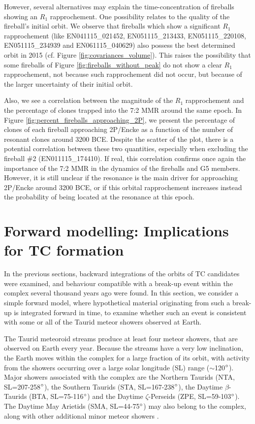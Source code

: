 \documentclass[letters,a4paper,fleqn,usenatbib]{mnras}
\begin{document}
However, several alternatives may explain the time-concentration of fireballs showing an $R_1$ rapprochement. One possibility relates to the quality of the fireball's initial orbit. We observe that fireballs which show a  significant $R_1$ rapprochement (like EN041115\_021452, EN051115\_213433, EN051115\_220108, EN051115\_234939 and EN061115\_040629) also possess the best determined orbit in 2015 (cf. Figure \ref{fig:covariances_volume}). This raises the possibility that some fireballs of Figure \ref{fig:fireballs_without_peak} do not show a clear $R_1$ rapprochement, not because such rapprochement did not occur, but because of the larger uncertainty of their initial orbit.
 
 Also, we see a correlation between the magnitude of the $R_1$ rapprochement and the percentage of clones trapped into the 7:2 MMR around the same epoch. In Figure \ref{fig:percent_fireballs_approaching_2P}, we present the percentage of clones of each fireball approaching 2P/Encke as a function of the number of resonant clones around 3200 BCE. Despite the scatter of the plot, there is a potential correlation between these two quantities, especially when excluding the fireball \#2 (EN011115\_174410). If real, this correlation confirms once again the importance of the 7:2 MMR in the dynamics of the fireballs and G5 members. However, it is still unclear if the resonance is the main driver for approaching 2P/Encke around 3200 BCE, or if this orbital rapprochement increases instead the probability of being located at the resonance at this epoch.  


 \section{Forward modelling: Implications for TC formation} \label{sec:TC_formation}

In the previous sections, backward integrations of the orbits of TC candidates were examined, and behaviour compatible with a break-up event within the complex several thousand years ago were found. In this section, we consider a simple forward model, where hypothetical material originating from such a break-up is integrated forward in time, to examine whether such an event is consistent with some or all of the Taurid meteor showers observed at Earth. 

The Taurid meteoroid streams produce at least four meteor showers, that are observed on Earth every year. Because the streams have a very low inclination, the Earth moves within the complex for a large fraction of its orbit, with activity from the showers occurring over a large solar longitude (SL) range ($\sim$120$\degree$). Major showers associated with the complex are the Northern Taurids (NTA, SL=207-258$\degree$), the Southern Taurids (STA, SL=167-238$\degree$), the Daytime $\beta$-Taurids (BTA, SL=75-116$\degree$) and the Daytime $\zeta$-Perseids (ZPE, SL=59-103$\degree$). The Daytime May Arietids (SMA, SL=44-75$\degree$) may also belong to the complex, along with other additional minor meteor showers \citep{Asher1991,Jenniskens2006}. 
\end{document}

